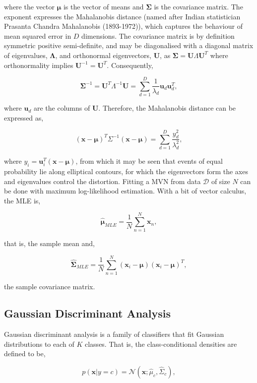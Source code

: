 \documentclass[11pt]{amsart}
\begin{document}
where the vector $\boldsymbol\mu$ is the vector of means and $\boldsymbol\Sigma$ is the covariance matrix. The exponent expresses the Mahalanobis distance (named after Indian statistician Prasanta Chandra Mahalanobis (1893-1972)), which captures the behaviour of mean squared error in $D$ dimensions. The covariance matrix is by definition symmetric positive semi-definite, and may be diagonalised with a diagonal matrix of eigenvalues, $\boldsymbol\Lambda$, and orthonormal eigenvectors, $\mathbf{U}$, as $\boldsymbol\Sigma = \mathbf{U}\Lambda\mathbf{U}^T$ where orthonormality implies $\mathbf{U}^{-1} = \mathbf{U}^T$. Consequently,

$$\boldsymbol\Sigma^{-1} = \mathbf{U}^T\Lambda^{-1}\mathbf{U} = \sum_{d=1}^D\frac{1}{\lambda_d}\mathbf{u}_d\mathbf{u}_d^T,$$

where $\mathbf{u}_d$ are the columns of $\mathbf{U}$. Therefore, the Mahalanobis distance can be expressed as,

$$(\mathbf{x} - \boldsymbol\mu)^T\Sigma^{-1}(\mathbf{x} - \boldsymbol\mu) = \sum_{d=1}^D\frac{y_d^2}{\lambda_d^2},$$

where $y_i = \mathbf{u}_i^T(\mathbf{x} - \boldsymbol\mu)$, from which it may be seen that events of equal probability lie along elliptical contours, for which the eigenvectors form the axes and eigenvalues control the distortion. Fitting a MVN from data $\mathcal{D}$ of size $N$ can be done with maximum log-likelihood estimation. With a bit of vector calculus, the MLE is,

$$\hat{\boldsymbol\mu}_{MLE} = \frac{1}{N}\sum_{n=1}^N\mathbf{x}_n,$$

that is, the sample mean and,

$$\hat{\boldsymbol\Sigma}_{MLE} = \frac{1}{N}\sum_{n=1}^N(\mathbf{x}_i - \boldsymbol\mu)(\mathbf{x}_i - \boldsymbol\mu)^T,$$

the sample covariance matrix.

\subsection{Gaussian Discriminant Analysis}

Gaussian discriminant analysis is a family of classifiers that fit Gaussian distributions to each of $K$ classes. That is, the class-conditional densities are defined to be,

$$p(\mathbf{x} | y = c) = \mathcal{N}(\mathbf{x} ; \hat{\mu}_c, \hat\Sigma_c),$$
\end{document}
